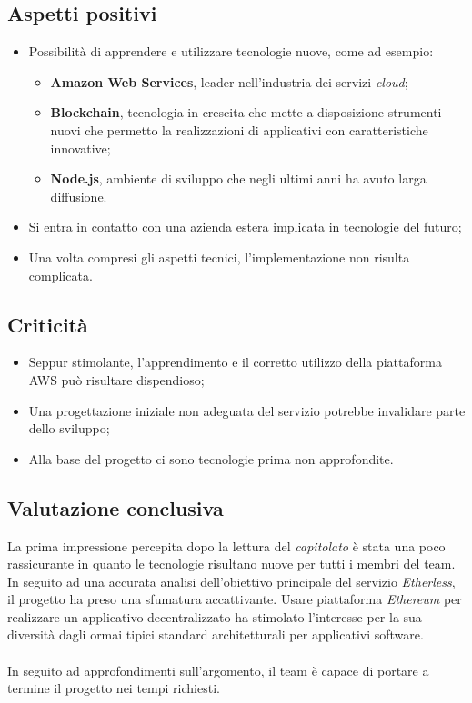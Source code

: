 \subsection{Aspetti positivi}
\begin{itemize}
	\item Possibilità di apprendere e utilizzare tecnologie nuove, come ad esempio:
		\begin{itemize}
			\item \textbf{Amazon Web Services}, leader nell'industria dei servizi \textit{cloud\glos};
			\item \textbf{Blockchain\glos}, tecnologia in crescita che mette a disposizione strumenti nuovi che permetto la realizzazioni di applicativi con caratteristiche innovative;
			\item \textbf{Node.js}, ambiente di sviluppo che negli ultimi anni ha avuto larga diffusione.
		\end{itemize}
	\item Si entra in contatto con una azienda estera implicata in tecnologie del futuro;
	\item Una volta compresi gli aspetti tecnici, l'implementazione non risulta complicata.
\end{itemize}

\subsection{Criticità}
\begin{itemize}
	\item Seppur stimolante, l'apprendimento e il corretto utilizzo della piattaforma AWS può risultare dispendioso;
	\item Una progettazione iniziale non adeguata del servizio potrebbe invalidare parte dello sviluppo;
	\item Alla base del progetto ci sono tecnologie prima non approfondite.
\end{itemize}

\subsection{Valutazione conclusiva}
La prima impressione percepita dopo la lettura del \textit{capitolato\glo} è stata una poco rassicurante in quanto le tecnologie risultano nuove per tutti i membri del team. In seguito ad una accurata analisi dell'obiettivo principale del servizio \textit{Etherless}, il progetto ha preso una sfumatura accattivante. Usare piattaforma \textit{Ethereum\glo} per realizzare un applicativo decentralizzato ha stimolato l'interesse per la sua diversità dagli ormai tipici standard architetturali per applicativi software.
\\\\
In seguito ad approfondimenti sull'argomento, il team è capace di portare a termine il progetto nei tempi richiesti.
